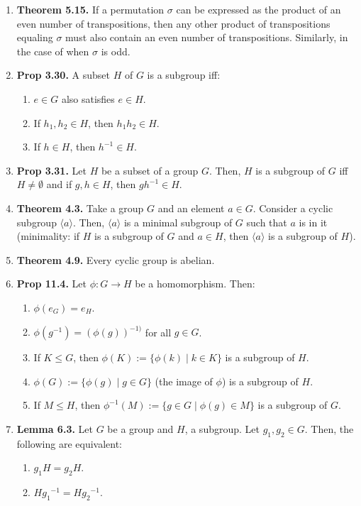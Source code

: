 \begin{enumerate}
	\item \textbf{Theorem 5.15. } If a permutation $\sigma$ can be expressed as the product of an even number of transpositions, then any other product of transpositions equaling $\sigma$ must also contain an even number of transpositions. Similarly, in the case of when $\sigma$ is odd. 
	\item \textbf{Prop 3.30. } A subset $H$ of $G$ is a subgroup iff: 
	\begin{enumerate}
		\item $e \in G$ also satisfies $e \in H$. 
		\item If $h_1,h_2 \in H$, then $h_1h_2 \in H$. 
		\item If $h \in H$, then $h^{-1} \in H$. 
	\end{enumerate}
	\item \textbf{Prop 3.31. } Let $H$ be a subset of a group $G$. Then, $H$ is a subgroup of $G$ iff $H \neq \emptyset$ and if $g,h \in H$, then $gh^{-1} \in H$. 
	\item \textbf{Theorem 4.3. } Take a group $G$ and an element $a \in G$. Consider a cyclic subgroup $\langle a \rangle$. Then, $\langle a \rangle$ is a minimal subgroup of $G$ such that $a$ is in it (minimality: if $H$ is a subgroup of $G$ and $a \in H$, then $\langle a \rangle$ is a subgroup of $H$). 
	\item \textbf{Theorem 4.9. } Every cyclic group is abelian. 
	\item \textbf{Prop 11.4. } Let $\phi: G \to H$ be a homomorphism. Then: 
	\begin{enumerate}
		\item $\phi(e_G) = e_H$. 
		\item $\phi(g^{-1}) = (\phi(g))^{-1)}$ for all $g \in G$. 
		\item If $K \leq G$, then $\phi(K) := \{\phi(k) \mid k \in K\}$ is a subgroup of $H$. 
		\item $\phi(G) := \{\phi(g) \mid g \in G\}$ (the image of $\phi$) is a subgroup of $H$. 
		\item If $M \leq H$, then $\phi^{-1}(M) := \{g \in G \mid \phi(g) \in M\}$ is a subgroup of $G$. 
	\end{enumerate}
	\item \textbf{Lemma 6.3. } Let $G$ be a group and $H$, a subgroup. Let $g_1,g_2 \in G$. Then, the following are equivalent: 
	\begin{enumerate}
		\item $g_1H = g_2H$. 
		\item $H{g_1}^{-1} = H{g_2}^{-1}$. 

\end{enumerate}
\end{enumerate}
